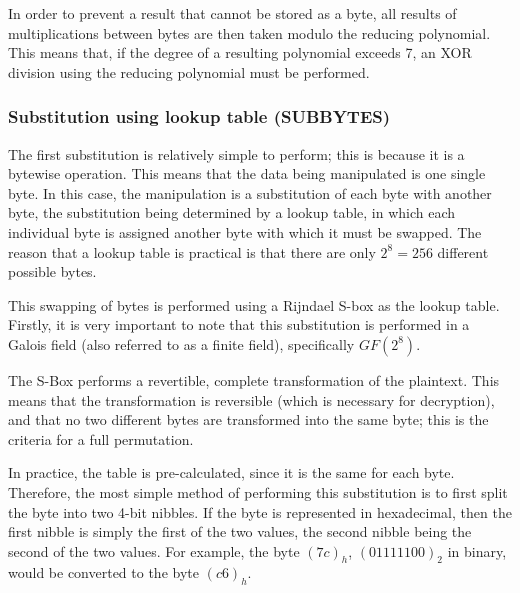 \documentclass[12pt]{report}
\begin{document}
In order to prevent a result that cannot be stored as a byte, all results of multiplications between bytes are then taken modulo the reducing polynomial. This means that, if the degree of a resulting polynomial exceeds 7, an XOR division using the reducing polynomial must be performed.

\subsubsection{Substitution using lookup table (SUBBYTES)}
The first substitution is relatively simple to perform; this is because it is a bytewise operation. This means that the data being manipulated is one single byte. In this case, the manipulation is a substitution of each byte with another byte, the substitution being determined by a lookup table, in which each individual byte is assigned another byte with which it must be swapped. The reason that a lookup table is practical is that there are only $2^8 = 256$ different possible bytes.

This swapping of bytes is performed using a Rijndael S-box as the lookup table. Firstly, it is very important to note that this substitution is performed in a Galois field (also referred to as a finite field)\cite{GaloisField}, specifically $GF(2^8)$.

The S-Box performs a revertible, complete transformation of the plaintext\cite{SBox}. This means that the transformation is reversible (which is necessary for decryption), and that no two different bytes are transformed into the same byte; this is the criteria for a full permutation.

In practice, the table is pre-calculated, since it is the same for each byte. Therefore, the most simple method of performing this substitution is to first split the byte into two 4-bit nibbles. If the byte is represented in hexadecimal, then the first nibble is simply the first of the two values, the second nibble being the second of the two values. For example, the byte $(7c)_h$, $(01111100)_2$ in binary, would be converted to the byte $(c6)_h$.
\end{document}
